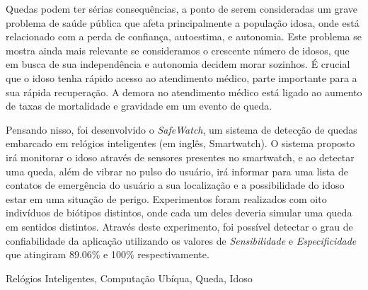Quedas podem ter sérias consequências,  a ponto de serem consideradas um grave problema de saúde pública que afeta principalmente a população idosa, onde está relacionado com a perda de confiança, autoestima, e autonomia. Este problema se mostra ainda mais relevante se consideramos o crescente número de idosos, que em busca de sua independência e autonomia decidem morar sozinhos. É crucial que o idoso tenha rápido acesso ao atendimento médico, parte importante para a sua rápida recuperação. A demora no atendimento médico está ligado ao aumento de taxas de mortalidade e gravidade em um evento de queda. 


Pensando nisso, foi desenvolvido o \textit{SafeWatch}, um sistema de detecção de quedas embarcado em relógios inteligentes (em inglês, Smartwatch). O sistema proposto irá monitorar o idoso através de sensores presentes no smartwatch, e ao detectar uma queda, além de vibrar no pulso do usuário, irá informar para uma lista de contatos de emergência do usuário a sua localização e a possibilidade do idoso estar em uma situação de perigo. Experimentos foram realizados com oito indivíduos de biótipos distintos, onde cada um deles deveria simular uma queda em sentidos distintos. Através deste experimento, foi possível detectar o grau de confiabilidade da aplicação utilizando os valores de \textit{Sensibilidade} e \textit{Especificidade} que atingiram 89.06\% e 100\% respectivamente.




\begin{keywords}
	Relógios Inteligentes, Computação Ubíqua, Queda, Idoso
\end{keywords}